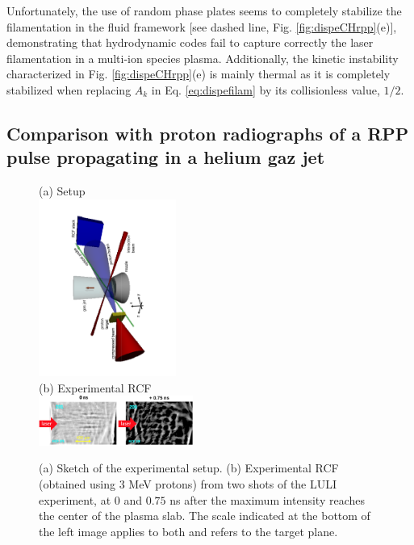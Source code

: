 \documentclass[
 reprint,
 superscriptaddress,
 amsmath,amssymb,
 aps,
]{revtex4-1}
\begin{document}
Unfortunately, the use of random phase plates seems to completely stabilize the filamentation in the fluid framework [see dashed line, Fig. \ref{fig:dispeCHrpp}(e)], demonstrating that  hydrodynamic codes fail to capture correctly the laser filamentation in a multi-ion species plasma. Additionally, the kinetic instability characterized in Fig. \ref{fig:dispeCHrpp}(e)  is mainly thermal as it is completely stabilized when   replacing  $A_k$ in Eq. \eqref{eq:dispefilam} by its collisionless value, $1/2$. 

\subsection{Comparison with proton radiographs of a RPP pulse propagating in a helium gaz jet}\label{sec:xp}
\begin{figure}
(a) Setup \\
\includegraphics[width=0.4\textwidth,angle=-90]{set_up.pdf}\\
(b) Experimental RCF \\
\includegraphics[width=0.45\textwidth]{rcf.png}
\caption{ \label{fig:xpfuchs_xp}  
(a) Sketch of the experimental setup.
(b) Experimental RCF (obtained using 3 MeV protons) from two shots of the LULI experiment, at $0$ and $0.75$ ns after the maximum intensity reaches the center of the plasma slab.  The scale indicated at the bottom of the left image applies to both and refers to the target plane. 
 }
\end{figure}
\end{document}
